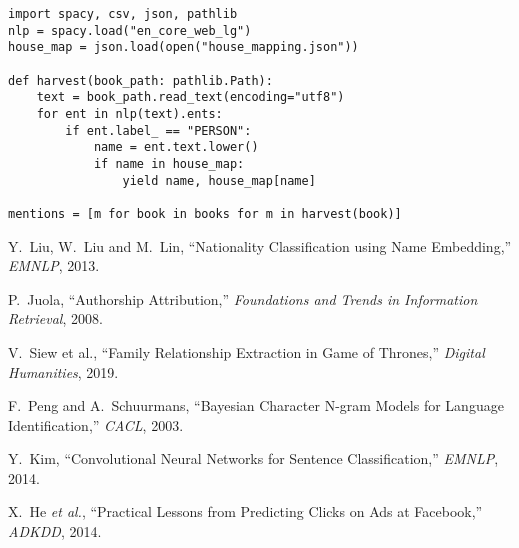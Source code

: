 \documentclass[12pt,a4paper]{article}
\begin{document}
\lstset{language=Python,basicstyle=\small\ttfamily,breaklines=true}
\begin{lstlisting}
import spacy, csv, json, pathlib
nlp = spacy.load("en_core_web_lg")
house_map = json.load(open("house_mapping.json"))

def harvest(book_path: pathlib.Path):
    text = book_path.read_text(encoding="utf8")
    for ent in nlp(text).ents:
        if ent.label_ == "PERSON":
            name = ent.text.lower()
            if name in house_map:
                yield name, house_map[name]

mentions = [m for book in books for m in harvest(book)]
\end{lstlisting}

\begin{thebibliography}{9}
Y.~Liu, W.~Liu and M.~Lin,
“Nationality Classification using Name Embedding,” \textit{EMNLP}, 2013.

P.~Juola, “Authorship Attribution,” \textit{Foundations and Trends in
Information Retrieval}, 2008.

V.~Siew et al., “Family Relationship Extraction in Game of Thrones,”
\textit{Digital Humanities}, 2019.

F.~Peng and A.~Schuurmans, “Bayesian Character N-gram Models for
Language Identification,” \textit{CACL}, 2003.

Y.~Kim, “Convolutional Neural Networks for Sentence Classification,”
\textit{EMNLP}, 2014.

X.~He \textit{et al.}, “Practical Lessons from Predicting Clicks on Ads at
Facebook,” \textit{ADKDD}, 2014.
\end{thebibliography}
\end{document}
